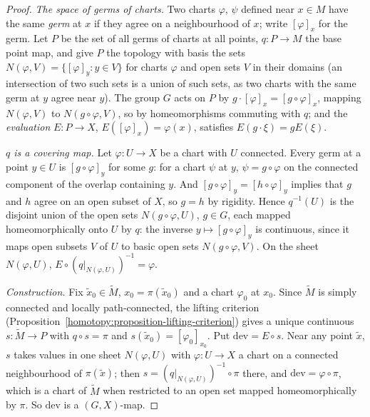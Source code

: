 \begin{proof}
\emph{The space of germs of charts.} Two charts $\varphi$, $\psi$ defined near $x \in M$ have the same \emph{germ} at $x$ if they agree on a neighbourhood of $x$; write $[\varphi]_x$ for the germ. Let $P$ be the set of all germs of charts
at all points, $q \colon P \to M$ the base point map, and give $P$ the topology with basis the sets $N(\varphi, V) = \{[\varphi]_y : y \in V\}$ for charts $\varphi$ and open sets $V$ in their domains (an intersection of two such sets
is a union of such sets, as two charts with the same germ at $y$ agree near $y$). The group $G$ acts on $P$ by $g \cdot [\varphi]_x = [g \circ \varphi]_x$, mapping $N(\varphi, V)$ to $N(g \circ \varphi, V)$, so by homeomorphisms
commuting with $q$; and the \emph{evaluation} $E \colon P \to X$, $E([\varphi]_x) = \varphi(x)$, satisfies $E(g \cdot \xi) = gE(\xi)$.

\emph{$q$ is a covering map.} Let $\varphi \colon U \to X$ be a chart with $U$ connected. Every germ at a point $y \in U$ is $[g \circ \varphi]_y$ for some $g$: for a chart $\psi$ at $y$, $\psi = g \circ \varphi$ on the connected
component of the overlap containing $y$. And $[g \circ \varphi]_y = [h \circ \varphi]_y$ implies that $g$ and $h$ agree on an open subset of $X$, so $g = h$ by rigidity. Hence $q^{-1}(U)$ is the disjoint union of the open sets
$N(g \circ \varphi, U)$, $g \in G$, each mapped homeomorphically onto $U$ by $q$: the inverse $y \mapsto [g \circ \varphi]_y$ is continuous, since it maps open subsets $V$ of $U$ to basic open sets $N(g \circ \varphi, V)$. On the sheet
$N(\varphi, U)$, $E \circ (q|_{N(\varphi, U)})^{-1} = \varphi$.

\emph{Construction.} Fix $\tilde x_0 \in \widetilde{M}$, $x_0 = \pi(\tilde x_0)$ and a chart $\varphi_0$ at $x_0$. Since $\widetilde{M}$ is simply connected and locally path-connected, the lifting criterion
(Proposition~\ref{homotopy:proposition-lifting-criterion}) gives a unique continuous $s \colon \widetilde{M} \to P$ with $q \circ s = \pi$ and $s(\tilde x_0) = [\varphi_0]_{x_0}$. Put $\mathrm{dev} = E \circ s$. Near any point $\tilde x$,
$s$ takes values in one sheet $N(\varphi, U)$ with $\varphi \colon U \to X$ a chart on a connected neighbourhood of $\pi(\tilde x)$; then $s = (q|_{N(\varphi, U)})^{-1} \circ \pi$ there, and $\mathrm{dev} = \varphi \circ \pi$, which is a
chart of $\widetilde{M}$ when restricted to an open set mapped homeomorphically by $\pi$. So $\mathrm{dev}$ is a $(G, X)$-map.


\end{proof}
